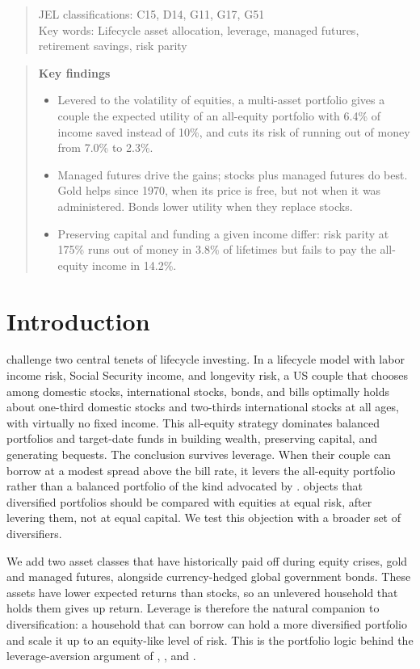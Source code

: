 \documentclass[12pt]{article}
\begin{document}
\begin{titlepage}
\begin{quote}
\medskip
\noindent JEL classifications: C15, D14, G11, G17, G51\\
Key words: Lifecycle asset allocation, leverage, managed futures, retirement savings, risk parity
\end{quote}
\begin{quote}\small
\textbf{Key findings}
\begin{itemize}[leftmargin=1.2em,itemsep=1pt,topsep=2pt]
\item Levered to the volatility of equities, a multi-asset portfolio gives a couple the expected utility
of an all-equity portfolio with 6.4\% of income saved instead of 10\%, and cuts its risk of running out of
money from 7.0\% to 2.3\%.
\item Managed futures drive the gains; stocks plus managed futures do best. Gold helps since 1970, when
its price is free, but not when it was administered. Bonds lower utility when they replace stocks.
\item Preserving capital and funding a given income differ: risk parity at 175\% runs out of money in 3.8\%
of lifetimes but fails to pay the all-equity income in 14.2\%.
\end{itemize}
\end{quote}
\end{titlepage}

\section{Introduction}

\citet{AnarkulovaCederburgODoherty2025} challenge two central tenets of lifecycle investing. In a
lifecycle model with labor income risk, Social Security income, and longevity risk, a US couple that
chooses among domestic stocks, international stocks, bonds, and bills optimally holds about one-third
domestic stocks and two-thirds international stocks at all ages, with virtually no fixed income. This
all-equity strategy dominates balanced portfolios and target-date funds in building wealth, preserving
capital, and generating bequests. The conclusion survives leverage. When their couple can borrow at a
modest spread above the bill rate, it levers the all-equity portfolio rather than a balanced portfolio
of the kind advocated by \citet{Asness1996}. \citet{Asness2024} objects that diversified portfolios
should be compared with equities at equal risk, after levering them, not at equal capital. We test
this objection with a broader set of diversifiers.

We add two asset classes that have historically paid off during equity crises, gold and managed futures,
alongside currency-hedged global government bonds. These assets have lower expected returns than stocks,
so an unlevered household that holds them gives up return. Leverage is therefore the natural companion to
diversification: a household that can borrow can hold a more diversified portfolio and scale it up to an
equity-like level of risk. This is the portfolio logic behind the leverage-aversion argument of
\citet{Asness1996}, \citet{FrazziniPedersen2014}, and \citet{AsnessFrazziniPedersen2012}.
\end{document}

